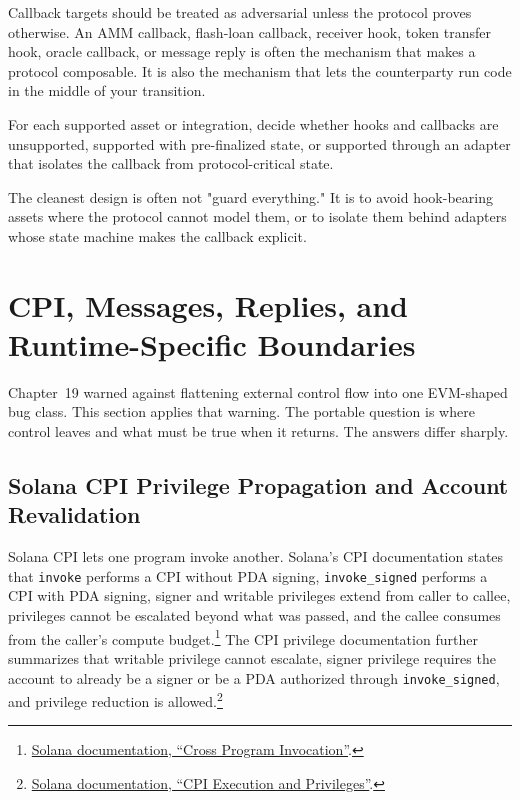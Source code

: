 Callback targets should be treated as adversarial unless the protocol proves otherwise. An AMM callback, flash-loan callback, receiver hook, token transfer hook, oracle callback, or message reply is often the mechanism that makes a protocol composable. It is also the mechanism that lets the counterparty run code in the middle of your transition.

\begin{artifactbox}
For each supported asset or integration, decide whether hooks and callbacks are unsupported, supported with pre-finalized state, or supported through an adapter that isolates the callback from protocol-critical state.
\end{artifactbox}

The cleanest design is often not "guard everything." It is to avoid hook-bearing assets where the protocol cannot model them, or to isolate them behind adapters whose state machine makes the callback explicit.

\section{CPI, Messages, Replies, and Runtime-Specific Boundaries}

Chapter~19 warned against flattening external control flow into one EVM-shaped bug class. This section applies that warning. The portable question is where control leaves and what must be true when it returns. The answers differ sharply.

\subsection{Solana CPI Privilege Propagation and Account Revalidation}

Solana CPI lets one program invoke another. Solana's CPI documentation states that \texttt{invoke} performs a CPI without PDA signing, \texttt{invoke\_signed} performs a CPI with PDA signing, signer and writable privileges extend from caller to callee, privileges cannot be escalated beyond what was passed, and the callee consumes from the caller's compute budget.\footnote{\href{https://solana.com/docs/core/cpi}{Solana documentation, ``Cross Program Invocation''}.} The CPI privilege documentation further summarizes that writable privilege cannot escalate, signer privilege requires the account to already be a signer or be a PDA authorized through \texttt{invoke\_signed}, and privilege reduction is allowed.\footnote{\href{https://solana.com/docs/core/cpi/cpi-execution}{Solana documentation, ``CPI Execution and Privileges''}.}

